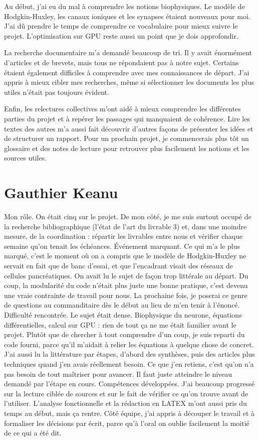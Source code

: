 \documentclass{report}
\begin{document}
Au début, j’ai eu du mal à comprendre les notions biophysiques. Le modèle de Hodgkin-Huxley, les canaux ioniques et les synapses étaient nouveaux pour moi. J’ai dû prendre le temps de comprendre ce vocabulaire pour mieux suivre le projet. L’optimisation sur GPU reste aussi un point que je dois approfondir.

La recherche documentaire m’a demandé beaucoup de tri. Il y avait énormément d’articles et de brevets, mais tous ne répondaient pas à notre sujet. Certains étaient également difficiles à comprendre avec mes connaissances de départ. J’ai appris à mieux cibler mes recherches, même si sélectionner les documents les plus utiles n’était pas toujours évident.

Enfin, les relectures collectives m’ont aidé à mieux comprendre les différentes parties du projet et à repérer les passages qui manquaient de cohérence. Lire les textes des autres m’a aussi fait découvrir d’autres façons de présenter les idées et de structurer un rapport. Pour un prochain projet, je commencerais plus tôt un glossaire et des notes de lecture pour retrouver plus facilement les notions et les sources utiles. 


\chapter{Gauthier Keanu}
Mon rôle. On était cinq sur le projet. De mon côté, je me suis surtout occupé de la recherche bibliographique (l’état de l’art du livrable 3) et, dans une moindre mesure, de la coordination : répartir les livrables entre nous et vérifier chaque semaine qu’on tenait les échéances.
Événement marquant. Ce qui m’a le plus marqué, c’est le moment où on a compris que le modèle de Hodgkin-Huxley ne servait en fait que de banc d’essai, et que l’encadrant visait des réseaux de cellules pancréatiques. On avait lu le sujet de façon trop littérale au départ. Du coup,
la modularité du code n’était plus juste une bonne pratique, c’est devenu une vraie contrainte de
travail pour nous. La prochaine fois, je poserai ce genre de questions au commanditaire dès le début
au lieu de m’en tenir à l’énoncé.
Difficulté rencontrée. Le sujet était dense. Biophysique du neurone, équations différentielles, calcul sur GPU : rien de tout ça ne me était familier avant le projet. Plutôt que de chercher à tout
comprendre d’un coup, je suis reparti du code fourni, parce qu’il m’aidait à relier les équations à
quelque chose de concret. J’ai aussi lu la littérature par étapes, d’abord des synthèses, puis des articles plus techniques quand j’en avais réellement besoin. Ce que j’en retiens, c’est qu’on n’a pas
besoin de tout maîtriser pour avancer. Il faut juste atteindre le niveau demandé par l’étape en cours.
Compétences développées. J’ai beaucoup progressé sur la lecture ciblée de sources et sur le fait de vérifier ce qu’on trouve avant de l’utiliser. L’analyse fonctionnelle et la rédaction en LATEX m’ont aussi pris du temps au début, mais ça rentre. Côté équipe, j’ai appris à découper le travail et à formaliser les décisions par écrit, parce qu’à l’oral on oublie facilement la moitié de ce qui a été
dit.
\end{document}
